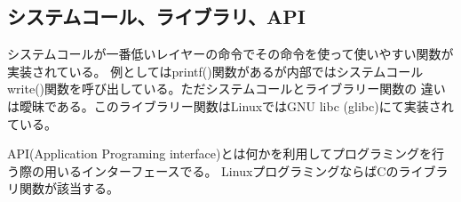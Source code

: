\subsection{システムコール、ライブラリ、API}

システムコールが一番低いレイヤーの命令でその命令を使って使いやすい関数が実装されている。
例としてはprintf()関数があるが内部ではシステムコールwrite()関数を呼び出している。ただシステムコールとライブラリー関数の
違いは曖昧である。このライブラリー関数はLinuxではGNU libc (glibc)にて実装されている。

API(Application Programing interface)とは何かを利用してプログラミングを行う際の用いるインターフェースでる。
LinuxプログラミングならばCのライブラリ関数が該当する。

